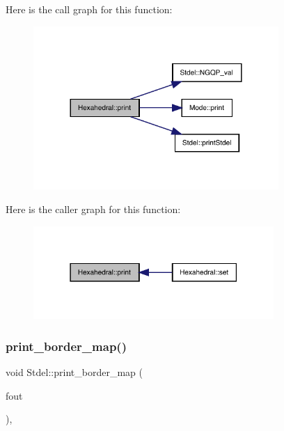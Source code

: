 Here is the call graph for this function\+:
\nopagebreak
\begin{figure}[H]
\begin{center}
\leavevmode
\includegraphics[width=264pt]{classHexahedral_af30ff09b60c553acabb51c5aa27d8d22_cgraph}
\end{center}
\end{figure}
Here is the caller graph for this function\+:
\nopagebreak
\begin{figure}[H]
\begin{center}
\leavevmode
\includegraphics[width=259pt]{classHexahedral_af30ff09b60c553acabb51c5aa27d8d22_icgraph}
\end{center}
\end{figure}
\mbox{\label{classStdel_a9a0c69dca7564f6ca4aa4f3c9864ea01}} 
\subsubsection{\texorpdfstring{print\+\_\+border\+\_\+map()}{print\_border\_map()}}
{\footnotesize\ttfamily void Stdel\+::print\+\_\+border\+\_\+map (\begin{DoxyParamCaption}\item[{F\+I\+LE $\ast$}]{fout }\end{DoxyParamCaption})\hspace{0.3cm}{\ttfamily [inline]}, {\ttfamily [inherited]}}



